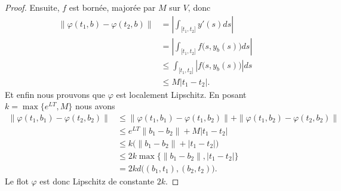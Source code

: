 \begin{proof}
	Ensuite, \( f\) est bornée, majorée par \( M\) sur \( V\), donc
	\begin{subequations}
		\begin{align}
			\| \varphi(t_1,b)-\varphi(t_2,b) \| & =| \int_{\mathopen[ t_1 , t_2 \mathclose]} y'(s)ds |                    \\
			                                    & =| \int_{\mathopen[ t_1 , t_2 \mathclose]}f\big( s,y_b(s) \big)ds |     \\
			                                    & \leq \int_{\mathopen[ t_1 , t_2 \mathclose]}| f\big( s,y_b(s) \big) |ds \\
			                                    & \leq M| t_1-t_2 |.
		\end{align}
	\end{subequations}
	Et enfin nous prouvons que \( \varphi\) est localement Lipschitz. En posant \( k=\max\{  e^{LT},M \}\) nous avons
	\begin{subequations}
		\begin{align}
			\| \varphi(t_1,b_1)-\varphi(t_2,b_2) \| & \leq \| \varphi(t_1,b_1)-\varphi(t_1,b_2) \|+\| \varphi(t_1,b_2)-\varphi(t_2,b_2) \| \\
			                                        & \leq  e^{LT}\| b_1-b_2 \|+M| t_1-t_2 |                                               \\
			                                        & \leq k\big( \| b_1-b_2 \|+| t_1-t_2 | \big)                                          \\
			                                        & \leq 2k\max\{ \| b_1-b_2 \|,| t_1-t_2 | \}                                           \\
			                                        & =2kd\big(  (b_1,t_1),(b_2,t_2)  \big).
		\end{align}
	\end{subequations}
	Le flot \( \varphi\) est donc Lipschitz de constante \( 2k\).
\end{proof}

